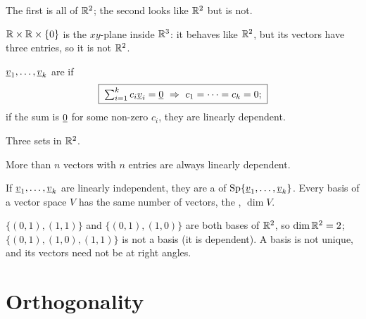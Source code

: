 \begin{example}
The first is all of $\R^2$; the second looks like $\R^2$ but is not.
\begin{deriv}
\end{deriv}
$\mathbb{R}\times\mathbb{R}\times\{0\}$ is the $xy$-plane inside $\mathbb{R}^3$: it behaves like $\R^2$, but its vectors have three entries, so it is not $\R^2$.
\end{example}

\begin{definition}
$\underline{v}_1,\dots,\underline{v}_k$ are  if
\[
  \boxed{\;\textstyle\sum_{i=1}^kc_i\vect{v}_i=\vect{0}\ \Rightarrow\ c_1=\dots=c_k=0;\;}
\]
if the sum is $\underline{0}$ for some non-zero $c_i$, they are linearly dependent.
\end{definition}

\begin{example}
Three sets in $\R^2$.
\begin{deriv}
\end{deriv}
More than $n$ vectors with $n$ entries are always linearly dependent.
\end{example}

\begin{definition}
If $\underline{v}_1,\dots,\underline{v}_k$ are linearly independent, they are a  of $\operatorname{Sp}\{\underline{v}_1,\dots,\underline{v}_k\}$. Every basis of a vector space $V$ has the same number of vectors, the , $\dim V$.
\end{definition}

\begin{example}[Bases of $\R^2$]
$\{(0,1),(1,1)\}$ and $\{(0,1),(1,0)\}$ are both bases of $\R^2$, so $\dim\mathbb{R}^2=2$; $\{(0,1),(1,0),(1,1)\}$ is not a basis (it is dependent). A basis is not unique, and its vectors need not be at right angles.
\end{example}

\section{Orthogonality}

